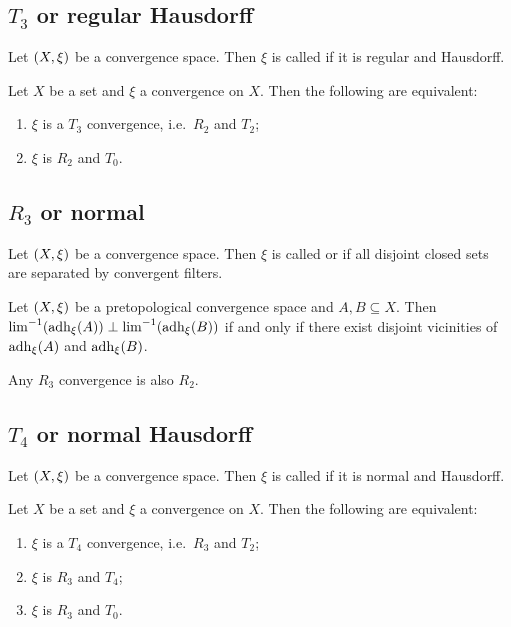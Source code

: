 \subsection{$T_3$ or regular Hausdorff}
\begin{definition}
Let $\left( X,\xi \right)$ be a convergence space. Then $\xi$ is called  if it is regular and Hausdorff.
\end{definition}

\begin{proposition}
Let $X$ be a set and $\xi$ a convergence on $X$. Then the following are equivalent:
\begin{enumerate}
\item $\xi$ is a $T_3$ convergence, i.e.\ $R_2$ and $T_2$;
\item $\xi$ is $R_2$ and $T_0$.
\end{enumerate}
\end{proposition}

\subsection{$R_3$ or normal}
\begin{definition}
Let $\left( X,\xi \right)$ be a convergence space. Then $\xi$ is called  or  if all disjoint closed sets are separated by convergent filters.
\end{definition}

\begin{proposition}
Let $\left( X,\xi \right)$ be a pretopological convergence space and $A,B\subseteq X$. Then $\lim^{-1}(\operatorname{adh}_\xi(A)) \perp \lim^{-1}(\operatorname{adh}_\xi(B))$ \textup{if and only if} there exist disjoint vicinities of $\operatorname{adh}_\xi(A)$ and $\operatorname{adh}_\xi(B)$.
\end{proposition}

\begin{proposition}
Any $R_3$ convergence is also $R_2$.
\end{proposition}


\subsection{$T_4$ or normal Hausdorff}
\begin{definition}
Let $\left( X,\xi \right)$ be a convergence space. Then $\xi$ is called  if it is normal and Hausdorff.
\end{definition}

\begin{proposition}
Let $X$ be a set and $\xi$ a convergence on $X$. Then the following are equivalent:
\begin{enumerate}
\item $\xi$ is a $T_4$ convergence, i.e.\ $R_3$ and $T_2$;
\item $\xi$ is $R_3$ and $T_4$;
\item $\xi$ is $R_3$ and $T_0$.
\end{enumerate}
\end{proposition}


